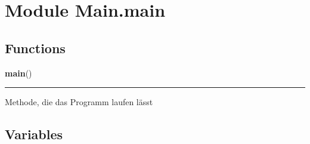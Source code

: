 %
%
%


\section{Module Main.main}

    \label{Main:main}


  \subsection{Functions}

    \label{Main:main:main}

    \vspace{0.5ex}

\hspace{.8\funcindent}\begin{boxedminipage}{\funcwidth}

    \raggedright \textbf{main}()

    \vspace{-1.5ex}

    \rule{\textwidth}{0.5\fboxrule}
\setlength{\parskip}{2ex}
    Methode, die das Programm laufen lässt

\setlength{\parskip}{1ex}
    \end{boxedminipage}



  \subsection{Variables}

